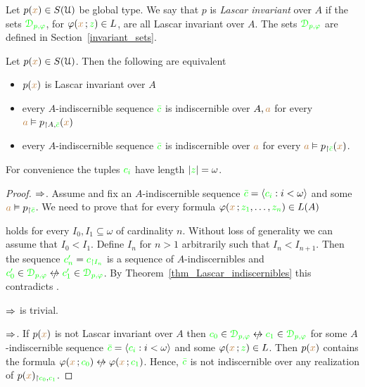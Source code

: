 Let $p({\color{brown} x})\in S(\EuScript U)$ be global type.
We say that $p$ is \emph{Lascar invariant\/} over $A$ if the sets ${\color{green}\EuScript D_{p,\varphi}}$, for $\varphi({\color{brown} x}\,;{\color{green} z})\in L$, are all Lascar invariant over $A$.
The sets ${\color{green}\EuScript D_{p,\varphi}}$ are defined in Section~\ref{invariant_sets}.

\begin{proposition}\label{prop_Lascar_indiscernibles}
  Let $p({\color{brown} x})\in S(\EuScript U)$.
  Then the following are equivalent
  \begin{itemize}
    \item[1.] $p({\color{brown} x})$ is Lascar invariant over $A$
    \item[2.] every $A$-indiscernible sequence ${\color{green}\bar c}$ is indiscernible over $A,{\color{brown} a}$ for every ${\color{brown} a}\vDash p_{\restriction A,{\color{green}\bar c}}({\color{brown} x})$
    \item[3.] every $A$-indiscernible sequence ${\color{green}\bar c}$ is indiscernible over ${\color{brown} a}$ for every ${\color{brown} a}\vDash p_{\restriction {\color{green}\bar c}}({\color{brown} x})$.
  \end{itemize}\smallskip
  For convenience the tuples ${\color{green} c_i}$ have length $|{\color{green} z}|=\omega$.
\end{proposition}

\begin{proof} $\Rightarrow$.
  Assume  and fix an $A$-indiscernible sequence ${\color{green}\bar c}=\langle{\color{green}c_i}:i<\omega\rangle$ and some ${\color{brown} a}\vDash p_{\restriction{\color{green}\bar c}}$.
  We need to prove that for every formula $\varphi({\color{brown} x}\,;{\color{green} z_1},\dots,{\color{green} z_n})\in L(A)$


  holds for every $I_0,I_1\subseteq\omega$ of cardinality $n$.
  Without loss of generality we can assume that $I_0<I_1$.
  Define $I_n$ for $n>1$ arbitrarily such that $I_n<I_{n+1}$.
  Then the sequence ${\color{green} c'_n}={\color{green} c_{\restriction I_n}}$ is a sequence of $A$-in\-dis\-cern\-i\-bles and ${\gr c'_0}\in{\gr\D_{p,\phi}}\niff {\gr c'_1}\in{\gr\D_{p,\phi}}$.
  By Theorem~\ref{thm_Lascar_indiscernibles} this contradicts .
  
  $\Rightarrow$ is trivial.

  $\Rightarrow$.
  If $p({\color{brown} x})$ is not Lascar invariant over $A$ then ${\gr c_0}\in{\gr\D_{p,\phi}}\niff {\gr c_1}\in{\gr\D_{p,\phi}}$ for some $A$-indiscernible sequence ${\color{green}\bar c}=\langle{\color{green}c_i}:i<\omega\rangle$ and some $\varphi({\color{brown} x}\,;{\color{green} z})\in L$.
  Then $p({\color{brown} x})$ contains the formula $\phi({\mr x}\,;{\gr c_0})\niff \phi({\mr x}\,;{\gr c_1})$.
  Hence, ${\color{green}\bar c}$ is not indiscernible over any realization of $p({\color{brown} x})_{\restriction{\color{green}c_0},{\color{green} c_1}}$.
\end{proof}

